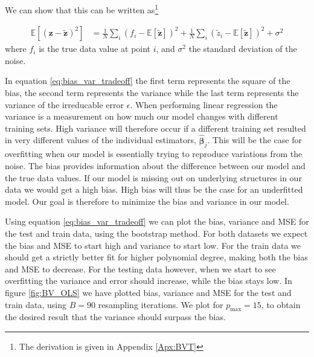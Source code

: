 \documentclass[reprint,english,notitlepage,aps,nobalancelastpage,nofootinbib]{revtex4-1}  %
\newcommand{\expz}{\mathbb{E}[\mathbf{\tilde{z}}]}
\begin{document}
We can show that this can be written as\footnote{The derivation is given in Appendix \ref{Apx:BVT}}

\begin{align}
\label{eq:bias_var_tradeoff}
  \mathbb{E}[(\mathbf{z}-\mathbf{\tilde{z}})^2] &= \frac{1}{N}\sum_i (f_i - \expz)^2 + \frac{1}{N}\sum_i (\tilde{z}_i - \expz)^2 + \sigma^2
\end{align}
where $f_i$ is the true data value at point $i$, and $\sigma^2$ the standard deviation of the noise.

In equation \eqref{eq:bias_var_tradeoff} the first term represents the square of the bias, the second term represents the variance while the last term represents the variance of the irreducable error $\epsilon$. When performing linear regression the variance is a measurement on how much our model changes with different training sets. High variance will therefore occur if a different training set resulted in very different values of the individual estimators, $\bm{\hat{\beta}}_j$. This will be the case for overfitting when our model is essentially trying to reproduce variations from the noise. The bias provides information about the difference between our model and the true data values. If our model is missing out on underlying structures in our data we would get a high bias. High bias will thus be the case for an underfitted model. Our goal is therefore to minimize the bias and variance in our model.

Using equation \eqref{eq:bias_var_tradeoff} we can plot the bias, variance and MSE for the test and train data, using the bootstrap method. For both datasets we expect the bias and MSE to start high and variance to start low. For the train data we should get a strictly better fit for higher polynomial degree, making both the bias and MSE to decrease. For the testing data however, when we start to see overfitting the variance and error should increase, while the bias stays low. In figure \ref{fig:BV_OLS} we have plotted bias, variance and MSE for the test and train data, using $B = 90$ resampling iterations. We plot for $p_\text{max} = 15$, to obtain the desired result that the variance should surpass the bias.
\end{document}
